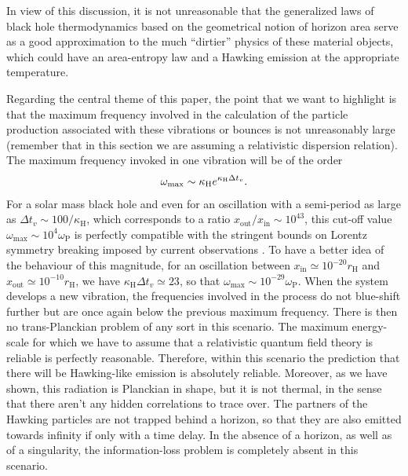 \documentclass[12pt]{article}
\begin{document}
In view of this discussion, it is not unreasonable
that the generalized laws of black hole
thermodynamics based on the  geometrical notion of horizon area serve as a good approximation to the much ``dirtier'' physics of these material objects, which could have an area-entropy law and a Hawking
emission at the appropriate temperature.
 
Regarding the central theme of this paper, the point that we want to highlight  is that the maximum frequency
involved in the calculation of the particle production associated with these
vibrations or bounces is not unreasonably large (remember that in this section
we are assuming a relativistic dispersion relation). The maximum frequency
invoked in one vibration will be of the order 
%
\begin{align}
\omega_{\rm max} \sim \kappa_\text{H} e^{\kappa_\text{H} \Delta t_v}.
\end{align}
%
For a solar mass black hole and even for an oscillation with a semi-period as large as $\Delta t_v \sim 100/\kappa_\text{H}$, which
corresponds to a ratio $x_\text{out}/x_\text{in} \sim10^{43}$, this cut-off
value $\omega_\text{max}\sim 10^4\omega_\text{P}$ is perfectly compatible with the
stringent bounds on Lorentz symmetry breaking imposed by current observations \cite{jacobson-liberati,liberati}.
To have a better idea of the behaviour of this magnitude, for an oscillation between
$x_\text{in}\simeq 10^{-20} r_\text{H}$ and $x_\text{out}\simeq 10^{-10}r_\text{H}$, we have
$\kappa_\text{H}\Delta t_v\simeq 23$, so that $\omega_\text{max}\sim
10^{-29}\omega_\text{P}$. 
%
When the system develops a new vibration, the frequencies involved
in the process do not blue-shift further but are once again below the previous maximum frequency. There is then no  trans-Planckian problem of any sort in this scenario. The maximum
energy-scale for which we have to assume that a relativistic quantum field
theory is reliable is perfectly reasonable. Therefore, within this scenario the
prediction that there will be Hawking-like emission is absolutely reliable. Moreover, as we have shown, this radiation is Planckian in shape, but it is not thermal, in the sense
that there aren't any hidden correlations to trace over. The partners of the Hawking particles are not trapped behind a horizon, so that they are also emitted towards infinity if only with a time delay. In the absence of a horizon, as well as of a singularity, the
information-loss problem is completely absent in this scenario.
\end{document}
